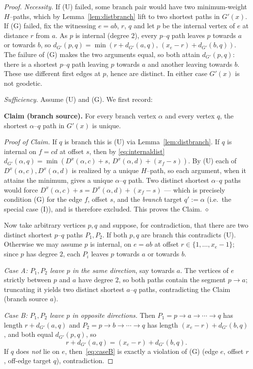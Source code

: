 \documentclass{amsart}
\theoremstyle{definition}
\begin{document}
\begin{proof}
\emph{Necessity.} If (U) failed, some branch pair would have two minimum-weight
$H$--paths, which by Lemma~\ref{lem:distbranch} lift to two shortest paths in
$G'(x)$. If (G) failed, fix the witnessing $e=ab$, $r$, $q$ and let $p$ be the
internal vertex of $e$ at distance $r$ from $a$. As $p$ is internal (degree $2$),
every $p$--$q$ path leaves $p$ towards $a$ or towards $b$, so
$d_{G'}(p,q)=\min(r+d_{G'}(a,q),\,(x_e-r)+d_{G'}(b,q))$. The failure of (G) makes
the two arguments equal, so both attain $d_{G'}(p,q)$: there is a shortest
$p$--$q$ path leaving $p$ towards $a$ and another leaving towards $b$. These use
different first edges at $p$, hence are distinct. In either case $G'(x)$ is not
geodetic.

\smallskip
\emph{Sufficiency.} Assume (U) and (G). We first record:

\smallskip
\noindent\textbf{Claim (branch source).} For every branch vertex $\alpha$ and
every vertex $q$, the shortest $\alpha$--$q$ path in $G'(x)$ is unique.

\noindent\emph{Proof of Claim.} If $q$ is branch this is (U) via
Lemma~\ref{lem:distbranch}. If $q$ is internal on $f=cd$ at offset $s$, then by
\eqref{eq:internaldist} $d_{G'}(\alpha,q)=\min(D^x(\alpha,c)+s,\,
D^x(\alpha,d)+(x_f-s))$. By (U) each of $D^x(\alpha,c),D^x(\alpha,d)$ is realized
by a unique $H$--path, so each argument, when it attains the minimum, gives a
unique $\alpha$--$q$ path. Two distinct shortest $\alpha$--$q$ paths would force
$D^x(\alpha,c)+s=D^x(\alpha,d)+(x_f-s)$ --- which is precisely condition (G) for
the edge $f$, offset $s$, and the \emph{branch} target $q':=\alpha$ (i.e.\ the
special case (I)), and is therefore excluded. This proves the Claim. \hfill$\diamond$

\smallskip
Now take arbitrary vertices $p,q$ and suppose, for contradiction, that there are
two distinct shortest $p$--$q$ paths $P_1,P_2$. If both $p,q$ are branch this
contradicts (U). Otherwise we may assume $p$ is internal, on $e=ab$ at offset
$r\in\{1,\dots,x_e-1\}$; since $p$ has degree $2$, each $P_i$ leaves $p$ towards
$a$ or towards $b$.

\emph{Case A: $P_1,P_2$ leave $p$ in the same direction}, say towards $a$. The
vertices of $e$ strictly between $p$ and $a$ have degree $2$, so both paths
contain the segment $p\to a$; truncating it yields two distinct shortest
$a$--$q$ paths, contradicting the Claim (branch source $a$).

\emph{Case B: $P_1,P_2$ leave $p$ in opposite directions.} Then
$P_1=p\to a\to\cdots\to q$ has length $r+d_{G'}(a,q)$ and
$P_2=p\to b\to\cdots\to q$ has length $(x_e-r)+d_{G'}(b,q)$, and both equal
$d_{G'}(p,q)$, so
\begin{equation}\label{eq:caseB}
 r+d_{G'}(a,q)=(x_e-r)+d_{G'}(b,q).
\end{equation}
If $q$ does \emph{not} lie on $e$, then~\eqref{eq:caseB} is exactly a violation
of (G) (edge $e$, offset $r$, off-edge target $q$), contradiction.


\end{proof}
\end{document}
